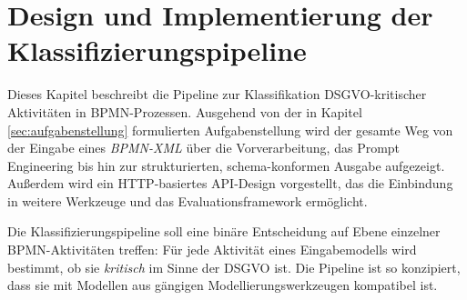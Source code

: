 \chapter{Design und Implementierung der Klassifizierungspipeline}\label{ch:klassifizierungsalgorithmus-(design-und-implementierung)}

Dieses Kapitel beschreibt die Pipeline zur Klassifikation \ac{DSGVO}-kritischer Aktivitäten in \ac{BPMN}-Prozessen. Ausgehend von der in Kapitel \ref{sec:aufgabenstellung} formulierten Aufgabenstellung wird der gesamte Weg von der Eingabe eines \emph{BPMN-XML} über die Vorverarbeitung, das Prompt Engineering bis hin zur strukturierten, schema-konformen Ausgabe aufgezeigt. Außerdem wird ein HTTP-basiertes API-Design vorgestellt, das die Einbindung in weitere Werkzeuge und das Evaluationsframework ermöglicht.

Die Klassifizierungspipeline soll eine binäre Entscheidung auf Ebene einzelner BPMN-Aktivitäten treffen: Für jede Aktivität eines Eingabemodells wird bestimmt, ob sie \emph{kritisch} im Sinne der \ac{DSGVO} ist. Die Pipeline ist so konzipiert, dass sie mit Modellen aus gängigen Modellierungswerkzeugen kompatibel ist.







